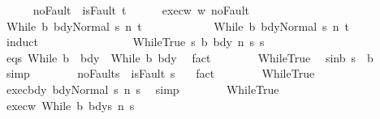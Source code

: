 \begin{isabellebody}
\ \ \ \ \isamarkupfalse%
\ noFault{\isacharcolon}\ {\isachardoublequoteopen}{\isasymnot}\ isFault\ t{\isachardoublequoteclose}\isanewline
\ \ \ \ \isamarkupfalse%
\ exec{\isacharunderscore}w\ w\ noFault\isanewline
\ \ \ \ \isamarkupfalse%
\ {\isachardoublequoteopen}{\isasymGamma}{\isasymturnstile}{\isasymlangle}While\ b\ bdy{}{\isacharcomma}Normal\ s{\isasymrangle}\ {\isacharequal}n{\isasymRightarrow}\ t\ {\isasymand}\ \isanewline
\ \ \ \ \ \ \ \ \ \ {\isasymGamma}{\isasymturnstile}{\isasymlangle}While\ b\ bdy{}{\isacharcomma}Normal\ s{\isasymrangle}\ {\isacharequal}n{\isasymRightarrow}\ t{\isachardoublequoteclose}\isanewline
\ \ \ \ \isamarkupfalse%
\ {\isacharparenleft}induct{\isacharparenright}\isanewline
\ \ \ \ \ \ \isamarkupfalse%
\ {}{}\isanewline
\ \ \ \ \ \ \isamarkupfalse%
\ {\isacharparenleft}WhileTrue\ s\ b{\isacharprime}\ bdy{\isacharprime}\ n\ s{\isacharprime}\ s{\isacharprime}{\isacharprime}{\isacharparenright}\isanewline
\ \ \ \ \ \ \isamarkupfalse%
\ eqs{\isacharcolon}\ {\isachardoublequoteopen}While\ b{\isacharprime}\ \ bdy{\isacharprime}\ {\isacharequal}\ While\ b\ bdy{\isachardoublequoteclose}\ \isamarkupfalse%
\ fact\isanewline
\ \ \ \ \ \ \isamarkupfalse%
\ WhileTrue\ \isamarkupfalse%
\ s{\isacharunderscore}in{\isacharunderscore}b{\isacharcolon}\ {\isachardoublequoteopen}s\ {\isasymin}\ b{\isachardoublequoteclose}\ \isamarkupfalse%
\ simp\isanewline
\ \ \ \ \ \ \isamarkupfalse%
\ noFault{\isacharunderscore}s{\isacharprime}{\isacharprime}{\isacharcolon}\ {\isachardoublequoteopen}{\isasymnot}\ isFault\ s{\isacharprime}{\isacharprime}{\isachardoublequoteclose}\ \ \isamarkupfalse%
\ fact\isanewline
\ \ \ \ \ \ \isamarkupfalse%
\ WhileTrue\ \isanewline
\ \ \ \ \ \ \isamarkupfalse%
\ exec{\isacharunderscore}bdy{\isacharcolon}\ {\isachardoublequoteopen}{\isasymGamma}{\isasymturnstile}{\isasymlangle}bdy{\isacharcomma}Normal\ s{\isasymrangle}\ {\isacharequal}n{\isasymRightarrow}\ s{\isacharprime}{\isachardoublequoteclose}\ \isamarkupfalse%
\ simp\isanewline
\ \ \ \ \ \ \isamarkupfalse%
\ WhileTrue\isanewline
\ \ \ \ \ \ \isamarkupfalse%
\ exec{\isacharunderscore}w{\isacharcolon}\ {\isachardoublequoteopen}{\isasymGamma}{\isasymturnstile}{\isasymlangle}While\ b\ bdy{\isacharcomma}s{\isacharprime}{\isasymrangle}\ {\isacharequal}n{\isasymRightarrow}\ s{\isacharprime}{\isacharprime}{\isachardoublequoteclose}\ \isamarkupfalse%

\end{isabellebody}
